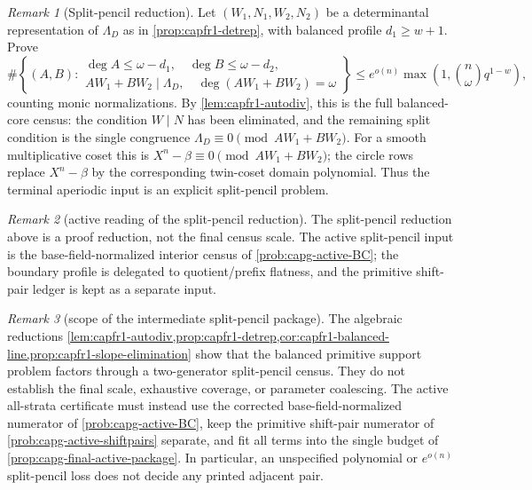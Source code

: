 \documentclass[11pt]{article}
\theoremstyle{definition}
\theoremstyle{remark}
\newtheorem{remark}[remark]{Remark}
\begin{document}
\begin{remark}[Split-pencil reduction]\label{prob:capfr1-split-pencil}
Let \((W_1,N_1,W_2,N_2)\) be a determinantal representation of \(\Lambda_D\) as in \cref{prop:capfr1-detrep}, with balanced profile \(d_1\ge w+1\).  Prove
\[
        \#\left\{(A,B):\begin{array}{l}
        \deg A\le\omega-d_1,
        \quad \deg B\le\omega-d_2,\\
        AW_1+BW_2\mid\Lambda_D,
        \quad \deg(AW_1+BW_2)=\omega
        \end{array}\right\}
        \le
        e^{o(n)}\max\left(1,\binom n\omega q^{1-w}\right),
\]
counting monic normalizations.  By \cref{lem:capfr1-autodiv}, this is the full balanced-core census: the condition \(W\mid N\) has been eliminated, and the remaining split condition is the single congruence \(\Lambda_D\equiv0\pmod{AW_1+BW_2}\).  For a smooth multiplicative coset this is \(X^n-\beta\equiv0\pmod{AW_1+BW_2}\); the circle rows replace \(X^n-\beta\) by the corresponding twin-coset domain polynomial.  Thus the terminal aperiodic input is an explicit split-pencil problem.
\end{remark}


\begin{remark}[active reading of the split-pencil reduction]
\label{rem:capfr1-split-pencil-active-reading}
The split-pencil reduction above is a proof reduction, not the final census
scale.  The active split-pencil input is the base-field-normalized interior
census of \cref{prob:capg-active-BC}; the boundary profile is delegated to
quotient/prefix flatness, and the primitive shift-pair ledger is kept as a
separate input.
\end{remark}

\begin{remark}[scope of the intermediate split-pencil package]\label{cor:capfr1-terminal-package}
The algebraic reductions \cref{lem:capfr1-autodiv,prop:capfr1-detrep,cor:capfr1-balanced-line,prop:capfr1-slope-elimination} show that the balanced primitive support problem factors through a two-generator split-pencil census.  They do not establish the final scale, exhaustive coverage, or parameter coalescing.  The active all-strata certificate must instead use the corrected base-field-normalized numerator of \cref{prob:capg-active-BC}, keep the primitive shift-pair numerator of \cref{prob:capg-active-shiftpairs} separate, and fit all terms into the single budget of \cref{prop:capg-final-active-package}.  In particular, an unspecified polynomial or $e^{o(n)}$ split-pencil loss does not decide any printed adjacent pair.
\end{remark}
\end{document}
